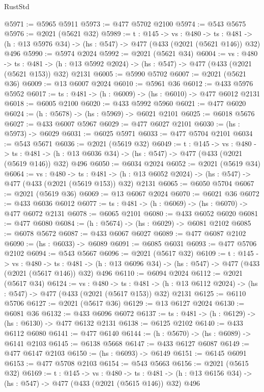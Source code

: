 \begin{lexlean}{RustStd}
\begin{coremodule}
@5971 := @5965 @5911
@5973 := @477 @5702 @2100
@5974 := @543 @5675
@5976 := @2021 (@5621 @32)
@5989 := {t : @145} ->
  {vs : @480} ->
  {ts : @481} -> (h : @13 @5976 @34) -> (hs : @547) -> @477 (@433 (@2021 (@5621 @146)) @32) @496
@5990 := @5974 @2024
@5992 := @2021 (@5621 @34)
@6004 := {vs : @480} ->
  {ts : @481} -> (h : @13 @5992 @2024) -> (hs : @547) -> @477 (@433 (@2021 (@5621 @153)) @32) @2131
@6005 := @5990 @5702
@6007 := @2021 (@5621 @36)
@6009 := @13 @6007 @2024
@6010 := @5961 @36
@6012 := @433 @5976 @5952
@6017 := {ts : @481} -> (h : @6009) -> (hs : @6010) -> @477 @6012 @2131
@6018 := @6005 @2100
@6020 := @433 @5992 @5960
@6021 := @477 @6020
@6024 := (h : @5678) -> (hs : @5969) -> @6021 @2101
@6025 := @6018 @5676
@6027 := @433 @6007 @5967
@6029 := @477 @6027 @2101
@6030 := (hs : @5973) -> @6029
@6031 := @6025 @5971
@6033 := @477 @5704 @2101
@6034 := @543 @5671
@6036 := @2021 (@5619 @32)
@6049 := {t : @145} ->
  {vs : @480} ->
  {ts : @481} -> (h : @13 @6036 @34) -> (hs : @547) -> @477 (@433 (@2021 (@5619 @146)) @32) @496
@6050 := @6034 @2024
@6052 := @2021 (@5619 @34)
@6064 := {vs : @480} ->
  {ts : @481} -> (h : @13 @6052 @2024) -> (hs : @547) -> @477 (@433 (@2021 (@5619 @153)) @32) @2131
@6065 := @6050 @5704
@6067 := @2021 (@5619 @36)
@6069 := @13 @6067 @2024
@6070 := @6021 @36
@6072 := @433 @6036 @6012
@6077 := {ts : @481} -> (h : @6069) -> (hs : @6070) -> @477 @6072 @2131
@6078 := @6065 @2101
@6080 := @433 @6052 @6020
@6081 := @477 @6080
@6084 := (h : @5674) -> (hs : @6029) -> @6081 @2102
@6085 := @6078 @5672
@6087 := @433 @6067 @6027
@6089 := @477 @6087 @2102
@6090 := (hs : @6033) -> @6089
@6091 := @6085 @6031
@6093 := @477 @5706 @2102
@6094 := @543 @5667
@6096 := @2021 (@5617 @32)
@6109 := {t : @145} ->
  {vs : @480} ->
  {ts : @481} -> (h : @13 @6096 @34) -> (hs : @547) -> @477 (@433 (@2021 (@5617 @146)) @32) @496
@6110 := @6094 @2024
@6112 := @2021 (@5617 @34)
@6124 := {vs : @480} ->
  {ts : @481} -> (h : @13 @6112 @2024) -> (hs : @547) -> @477 (@433 (@2021 (@5617 @153)) @32) @2131
@6125 := @6110 @5706
@6127 := @2021 (@5617 @36)
@6129 := @13 @6127 @2024
@6130 := @6081 @36
@6132 := @433 @6096 @6072
@6137 := {ts : @481} -> (h : @6129) -> (hs : @6130) -> @477 @6132 @2131
@6138 := @6125 @2102
@6140 := @433 @6112 @6080
@6141 := @477 @6140
@6144 := (h : @5670) -> (hs : @6089) -> @6141 @2103
@6145 := @6138 @5668
@6147 := @433 @6127 @6087
@6149 := @477 @6147 @2103
@6150 := (hs : @6093) -> @6149
@6151 := @6145 @6091
@6153 := @477 @5708 @2103
@6154 := @543 @5663
@6156 := @2021 (@5615 @32)
@6169 := {t : @145} ->
  {vs : @480} ->
  {ts : @481} -> (h : @13 @6156 @34) -> (hs : @547) -> @477 (@433 (@2021 (@5615 @146)) @32) @496

\end{coremodule}
\end{lexlean}
